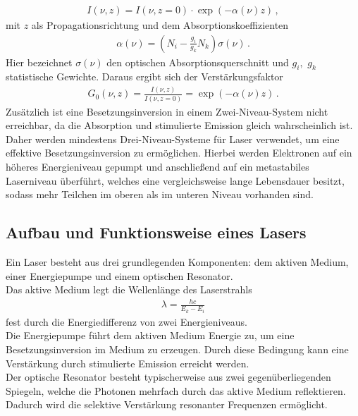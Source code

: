 \begin{align}
    I(\nu, z) = I(\nu, z=0)\cdot \exp(- \alpha(\nu)z)\,, \label{eqn:IntensitaetVerstaerkung}
\end{align}
mit $z$ als Propagationsrichtung und dem Absorptionskoeffizienten 
\begin{align}
    \alpha(\nu) = \left(N_i - \frac{g_i}{g_k} N_k \right)\sigma(\nu)\,. \label{eqn:Absorptionskoeffizienten}
\end{align}
Hier bezeichnet $\sigma(\nu)$ den optischen Absorptionsquerschnitt und $g_i,\,\,g_k$ statistische Gewichte.
Daraus ergibt sich der Verstärkungsfaktor 
\begin{align}
    G_0(\nu, z) = \frac{I(\nu, z)}{I(\nu, z=0)}= \exp(-\alpha(\nu) z)\,. \label{eqn:Verstaerkungsfaktor}
\end{align}
Zusätzlich ist eine Besetzungsinversion in einem  Zwei-Niveau-System nicht erreichbar, da die Absorption und stimulierte Emission gleich wahrscheinlich ist. Daher werden mindestens Drei-Niveau-Systeme für Laser verwendet, um eine effektive Besetzungsinversion zu ermöglichen. Hierbei werden Elektronen auf ein höheres Energieniveau gepumpt und anschließend auf ein metastabiles Laserniveau überführt, welches eine vergleichsweise lange Lebensdauer besitzt, sodass mehr Teilchen im oberen als im unteren Niveau vorhanden sind. \cite{laserspektroskopie} \cite{laser}

\subsection{Aufbau und Funktionsweise eines Lasers}
Ein Laser besteht aus drei grundlegenden Komponenten: dem aktiven Medium, einer Energiepumpe und einem optischen Resonator.\\
Das aktive Medium legt die Wellenlänge des Laserstrahls
\begin{align}
    \lambda = \frac{h c}{E_k - E_i} \label{eqn:Wellenlange}
\end{align} 
fest durch die Energiedifferenz von zwei Energieniveaus.\\
Die Energiepumpe führt dem aktiven Medium Energie zu, um eine Besetzungsinversion im Medium zu erzeugen. Durch diese Bedingung kann eine Verstärkung durch stimulierte Emission erreicht werden.\\
Der optische Resonator besteht typischerweise aus zwei gegenüberliegenden Spiegeln, welche die Photonen mehrfach durch das aktive Medium reflektieren. 
Dadurch wird die selektive Verstärkung resonanter Frequenzen ermöglicht. \cite{laserspektroskopie}

